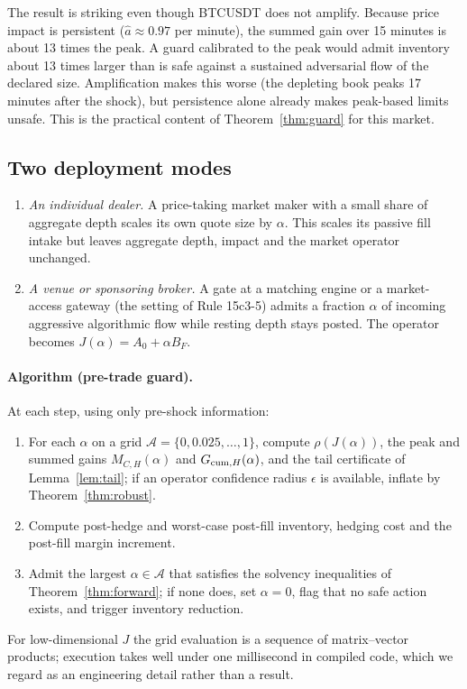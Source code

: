 The result is striking even though BTCUSDT does not amplify. Because price impact is persistent ($\hat a\approx0.97$ per minute), the summed gain over 15 minutes is about 13 times the peak. A guard calibrated to the peak would admit inventory about 13 times larger than is safe against a sustained adversarial flow of the declared size. Amplification makes this worse (the depleting book peaks 17 minutes after the shock), but persistence alone already makes peak-based limits unsafe. This is the practical content of Theorem~\ref{thm:guard} for this market.

\subsection{Two deployment modes}

\begin{enumerate}[label=\textbf{Mode \Alph*.},leftmargin=*]
\item \emph{An individual dealer.} A price-taking market maker with a small share of aggregate depth scales its own quote size by $\alpha$. This scales its passive fill intake but leaves aggregate depth, impact and the market operator unchanged.
\item \emph{A venue or sponsoring broker.} A gate at a matching engine or a market-access gateway (the setting of Rule 15c3-5) admits a fraction $\alpha$ of incoming aggressive algorithmic flow while resting depth stays posted. The operator becomes $J(\alpha)=A_0+\alpha B_F$.
\end{enumerate}

\paragraph{Algorithm (pre-trade guard).} At each step, using only pre-shock information:
\begin{enumerate}[itemsep=1pt]
\item For each $\alpha$ on a grid $\mathcal A=\{0,0.025,\ldots,1\}$, compute $\rho(J(\alpha))$, the peak and summed gains $M_{C,H}(\alpha)$ and $G_{{\rm cum},H}(\alpha)$, and the tail certificate of Lemma~\ref{lem:tail}; if an operator confidence radius $\epsilon$ is available, inflate by Theorem~\ref{thm:robust}.
\item Compute post-hedge and worst-case post-fill inventory, hedging cost and the post-fill margin increment.
\item Admit the largest $\alpha\in\mathcal A$ that satisfies the solvency inequalities of Theorem~\ref{thm:forward}; if none does, set $\alpha=0$, flag that no safe action exists, and trigger inventory reduction.
\end{enumerate}
For low-dimensional $J$ the grid evaluation is a sequence of matrix--vector products; execution takes well under one millisecond in compiled code, which we regard as an engineering detail rather than a result.

